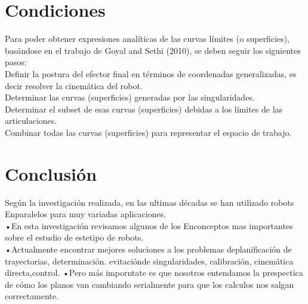 \documentclass[11pt,a4paper,oldfontcommands,oneside]{memoir}
\begin{document}
\section{Condiciones}
Para poder obtener expresiones analíticas de las curvas límites (o superficies), basándose en el trabajo de Goyal and Sethi (2010), se deben seguir los siguientes pasos:\\
Definir la postura del efector final en términos de coordenadas generalizadas, es decir resolver la cinemática del robot.\\
Determinar las curvas (superficies) generadas por las singularidades.\\
Determinar el subset de esas curvas (superficies) debidas a los límites de las articulaciones.\\
Combinar todas las curvas (superficies) para representar el espacio de trabajo.\\
\cite{baturone2005robotica}
\section{Conclusión}
Según la investigación realizada, en las ultimas décadas se han utilizado robots Enparalelos para muy variadas aplicaciones.\\
•En esta investigación revisamos algunos de los Enconceptos mas importantes sobre el estudio de estetipo de robots.\\
•Actualmente encontrar mejores soluciones a los problemas deplanificación de trayectorias, determinación. evitaciónde singularidades, calibración, cinemática directa,control.
•Pero más imporntate es que nosotros entendamos la prespectica de cómo los planos van cambiando serialmente para que los calculos nos salgan correctamente.



\end{document}
